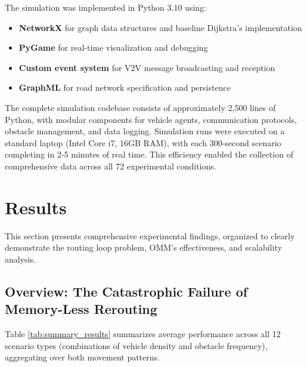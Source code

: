 \documentclass[conference]{IEEEtran}
\begin{document}
The simulation was implemented in Python 3.10 using:
\begin{itemize}
    \item \textbf{NetworkX} for graph data structures and baseline Dijkstra's implementation
    \item \textbf{PyGame} for real-time visualization and debugging
    \item \textbf{Custom event system} for V2V message broadcasting and reception
    \item \textbf{GraphML} for road network specification and persistence
\end{itemize}

The complete simulation codebase consists of approximately 2,500 lines of Python, with modular components for vehicle agents, communication protocols, obstacle management, and data logging. Simulation runs were executed on a standard laptop (Intel Core i7, 16GB RAM), with each 300-second scenario completing in 2-5 minutes of real time. This efficiency enabled the collection of comprehensive data across all 72 experimental conditions.

\section{Results}

This section presents comprehensive experimental findings, organized to clearly demonstrate the routing loop problem, OMM's effectiveness, and scalability analysis.

\subsection{Overview: The Catastrophic Failure of Memory-Less Rerouting}

Table \ref{tab:summary_results} summarizes average performance across all 12 scenario types (combinations of vehicle density and obstacle frequency), aggregating over both movement patterns.
\end{document}
